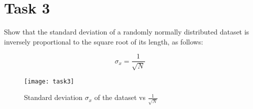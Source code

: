 \newpage
\section{Task 3}
Show that the standard deviation of a randomly normally distributed dataset is inversely proportional to the square root of its length, as follows:

\begin{equation}
\sigma_x = \frac{1}{\sqrt{N}}
\end{equation}

\begin{listing}[H]
    
\end{listing}

\begin{figure}[H]
    \centering
    \texttt{[image: task3]}
    \caption{Standard deviation $\sigma_x$ of the dataset vs $\frac{1}{\sqrt{N}}$}
\end{figure}